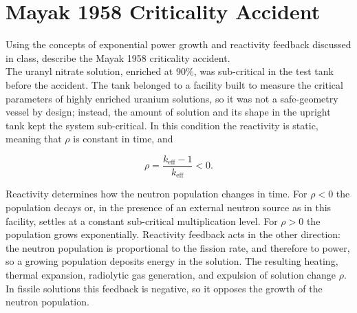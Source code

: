 \documentclass[11pt,a4paper]{article}
\newcommand*\sq{\mathbin{\vcenter{\hbox{\rule{.3ex}{.3ex}}}}} %
\begin{document}


\section{Mayak 1958 Criticality Accident}
Using the concepts of exponential power growth and reactivity feedback discussed in class,
describe the Mayak 1958 criticality accident. \\

The uranyl nitrate solution, enriched at 90$\%$, was sub-critical in the test tank before the accident. The tank belonged to a facility built to measure the critical parameters of highly enriched uranium solutions, so it was not a safe-geometry vessel by design; instead, the amount of solution and its shape in the upright tank kept the system sub-critical. In this condition the reactivity is static, meaning that $\rho$ is constant in time, and

\begin{equation}
\rho = \frac{k_{\mathrm{eff}} - 1}{k_{\mathrm{eff}}} < 0.
\label{eq:rho}
\end{equation}

Reactivity determines how the neutron population changes in time. For $\rho < 0$ the population decays or, in the presence of an external neutron source as in this facility, settles at a constant sub-critical multiplication level. For $\rho > 0$ the population grows exponentially. Reactivity feedback acts in the other direction: the neutron population is proportional to the fission rate, and therefore to power, so a growing population deposits energy in the solution. The resulting heating, thermal expansion, radiolytic gas generation, and expulsion of solution change $\rho$. In fissile solutions this feedback is negative, so it opposes the growth of the neutron population. \\
\end{document}
